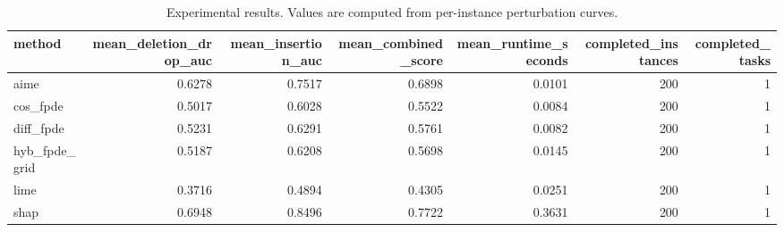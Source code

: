 \begin{table}[t]
\caption{Experimental results. Values are computed from per-instance perturbation curves.}
\label{tab:main_results_computed}
\centering
\begin{tabular}{lrrrrrr}
\toprule
method & mean\_deletion\_drop\_auc & mean\_insertion\_auc & mean\_combined\_score & mean\_runtime\_seconds & completed\_instances & completed\_tasks \\
\midrule
aime & 0.6278 & 0.7517 & 0.6898 & 0.0101 & 200 & 1 \\
cos\_fpde & 0.5017 & 0.6028 & 0.5522 & 0.0084 & 200 & 1 \\
diff\_fpde & 0.5231 & 0.6291 & 0.5761 & 0.0082 & 200 & 1 \\
hyb\_fpde\_grid & 0.5187 & 0.6208 & 0.5698 & 0.0145 & 200 & 1 \\
lime & 0.3716 & 0.4894 & 0.4305 & 0.0251 & 200 & 1 \\
shap & 0.6948 & 0.8496 & 0.7722 & 0.3631 & 200 & 1 \\
\bottomrule
\end{tabular}

\end{table}
